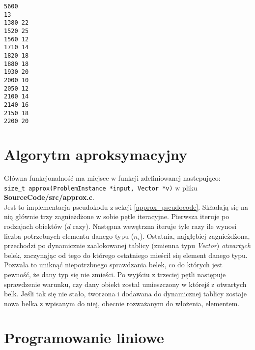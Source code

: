 \begin{lstlisting} 
5600
13
1380 22
1520 25
1560 12
1710 14
1820 18
1880 18
1930 20
2000 10
2050 12
2100 14
2140 16
2150 18
2200 20 
\end{lstlisting}

\section{Algorytm aproksymacyjny}
Główna funkcjonalność ma miejsce w funkcji zdefiniowanej nastepująco: \\ \verb|size_t approx(ProblemInstance *input, Vector *v)| w pliku \textbf{SourceCode/src/approx.c}. \\
Jest to implementacja pseudokodu z sekcji \ref{approx_pseudocode}.
Składają się na nią głównie trzy zagnieżdżone w sobie pętle iteracyjne.
Pierwsza iteruje po rodzajach obiektów ($d$ razy).
Następna wewętrzna iteruje tyle razy ile wynosi liczba potrzebnych elementu danego typu ($n_i$).
Ostatnia, najgłębiej zagnieżdżona, przechodzi po dynamicznie zaalokowanej tablicy (zmienna typu \textit{Vector}) \textit{otwartych} belek, zaczynąjąc od tego do którego ostatniego mieścił się element danego typu. Pozwala to uniknąć niepotrzbnego sprawdzania belek, co do których jest pewność, że dany typ się nie zmieści. 
Po wyjściu z trzeciej pętli następuje sprawdzenie warunku, czy dany obiekt został umieszczony w którejś z otwartych belk. Jeśli tak się nie stało, tworzona i dodawana do dynamicznej tablicy zostaje nowa belka z wpisanym do niej, obecnie rozważanym do włożenia, elementem.

\section{Programowanie liniowe}
